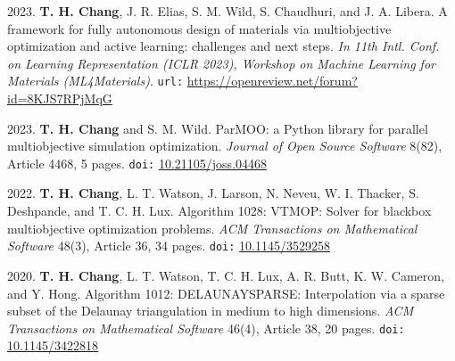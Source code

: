 \documentclass[alternative,compact,blue]{/Users/tyler/Git/thchang-style/styles/lualatex/yaac-another-awesome-cv}
\begin{document}
\begin{etaremune}
\item 2023. {\bf T. H. Chang}, J. R. Elias, S. M. Wild, S. Chaudhuri, and J. A. Libera. A framework for fully autonomous design of materials via multiobjective optimization and active learning: challenges and next steps. {\sl In 11th Intl. Conf. on Learning Representation (ICLR 2023), Workshop on Machine Learning for Materials (ML4Materials)}. {\tt url:} \url{https://openreview.net/forum?id=8KJS7RPjMqG}
\item 2023. {\bf T. H. Chang} and S. M. Wild. ParMOO: a Python library for parallel multiobjective simulation optimization. {\sl Journal of Open Source Software} 8(82), Article 4468, 5 pages. {\tt doi:} \href{https://doi.org/10.21105/joss.04468}{10.21105/joss.04468}
\item 2022. {\bf T. H. Chang}, L. T. Watson, J. Larson, N. Neveu, W. I. Thacker, S. Deshpande, and T. C. H. Lux. Algorithm 1028: VTMOP: Solver for blackbox multiobjective optimization problems. {\sl ACM Transactions on Mathematical Software} 48(3), Article 36, 34 pages. {\tt doi:} \href{https://doi.org/10.1145/3529258}{10.1145/3529258}
\item 2020. {\bf T. H. Chang}, L. T. Watson, T. C. H. Lux, A. R. Butt, K. W. Cameron, and Y. Hong. Algorithm 1012: DELAUNAYSPARSE: Interpolation via a sparse subset of the Delaunay triangulation in medium to high dimensions. {\sl ACM Transactions on Mathematical Software} 46(4), Article 38, 20 pages. {\tt doi:} \href{https://doi.org/10.1145/3422818}{10.1145/3422818}
\end{etaremune}

\goodbreak

\bigskip


\nopagebreak \bigskip \nopagebreak
\end{document}
